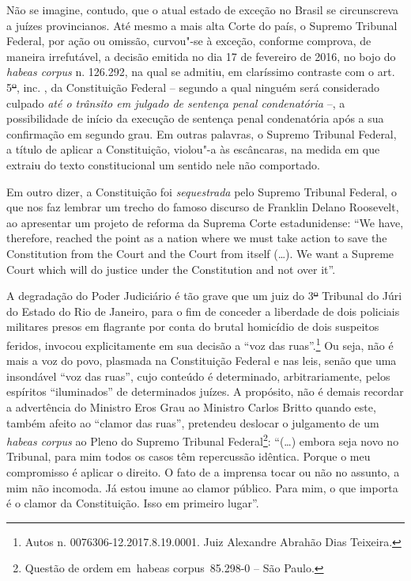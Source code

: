 Não se imagine, contudo, que o atual estado de exceção no Brasil se
circunscreva a juízes provincianos. Até mesmo a mais alta Corte do país,
o Supremo Tribunal Federal, por ação ou omissão, curvou"-se à exceção,
conforme comprova, de maneira irrefutável, a decisão emitida no dia 17
de fevereiro de 2016, no bojo do \emph{habeas corpus} n. 126.292, na
qual se admitiu, em claríssimo contraste com o art. 5\sout{º}, inc.
, da Constituição Federal -- segundo a qual ninguém será considerado
culpado \emph{até o trânsito em julgado de sentença penal condenatória}
--, a possibilidade de início da execução de sentença penal condenatória
após a sua confirmação em segundo grau. Em outras palavras, o Supremo
Tribunal Federal, a título de aplicar a Constituição, violou"-a às
escâncaras, na medida em que extraiu do texto constitucional um sentido
nele não comportado.

Em outro dizer, a Constituição foi \emph{sequestrada} pelo Supremo
Tribunal Federal, o que nos faz lembrar um trecho do famoso discurso de
Franklin Delano Roosevelt, ao apresentar um projeto de reforma da
Suprema Corte estadunidense: ``We have, therefore, reached the point as
a nation where we must take action to save the Constitution from the
Court and the Court from itself (\ldots{}). We want a Supreme Court which
will do justice under the Constitution and not over it''.

A degradação do Poder Judiciário é tão grave que um juiz do 3\sout{º}
Tribunal do Júri do Estado do Rio de Janeiro, para o fim de conceder a
liberdade de dois policiais militares presos em flagrante por conta do
brutal homicídio de dois suspeitos feridos, invocou explicitamente em
sua decisão a ``voz das ruas''.\footnote{Autos n.
  0076306-12.2017.8.19.0001. Juiz Alexandre Abrahão Dias Teixeira.} Ou
seja, não é mais a voz do povo, plasmada na Constituição Federal e nas
leis, senão que uma insondável ``voz das ruas'', cujo conteúdo é
determinado, arbitrariamente, pelos espíritos ``iluminados'' de
determinados juízes. A propósito, não é demais recordar a advertência do
Ministro Eros Grau ao Ministro Carlos Britto quando este, também afeito
ao ``clamor das ruas'', pretendeu deslocar o julgamento de um
\emph{habeas corpus} ao Pleno do Supremo Tribunal Federal\footnote{Questão
  de ordem em~habeas corpus~85.298-0 -- São Paulo.}: ``(\ldots{}) embora seja
novo no Tribunal, para mim todos os casos têm repercussão idêntica.
Porque o meu compromisso é aplicar o direito. O fato de a imprensa tocar
ou não no assunto, a mim não incomoda. Já estou imune ao clamor público.
Para mim, o que importa é o clamor da Constituição. Isso em primeiro
lugar''.

